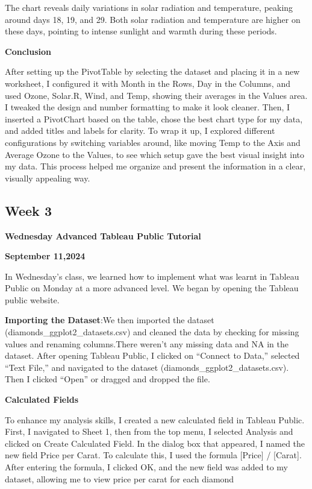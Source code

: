 \documentclass[
  letterpaper,
  DIV=11,
  numbers=noendperiod]{scrreprt}
\begin{document}
The chart reveals daily variations in solar radiation and temperature,
peaking around days 18, 19, and 29. Both solar radiation and temperature
are higher on these days, pointing to intense sunlight and warmth during
these periods.

\textbf{Conclusion}

After setting up the PivotTable by selecting the dataset and placing it
in a new worksheet, I configured it with Month in the Rows, Day in the
Columns, and used Ozone, Solar.R, Wind, and Temp, showing their averages
in the Values area. I tweaked the design and number formatting to make
it look cleaner. Then, I inserted a PivotChart based on the table, chose
the best chart type for my data, and added titles and labels for
clarity. To wrap it up, I explored different configurations by switching
variables around, like moving Temp to the Axis and Average Ozone to the
Values, to see which setup gave the best visual insight into my data.
This process helped me organize and present the information in a clear,
visually appealing way.

\subsection{Week 3}\label{week-3-5}

\textbf{Wednesday Advanced Tableau Public Tutorial}

\textbf{September 11,2024}

In Wednesday's class, we learned how to implement what was learnt in
Tableau Public on Monday at a more advanced level. We began by opening
the Tableau public website.

\textbf{Importing the Dataset}:We then imported the dataset
(diamonds\_ggplot2\_datasets.csv) and cleaned the data by checking for
missing values and renaming columns.There weren't any missing data and
NA in the dataset. After opening Tableau Public, I clicked on ``Connect
to Data,'' selected ``Text File,'' and navigated to the dataset
(diamonds\_ggplot2\_datasets.csv). Then I clicked ``Open'' or dragged
and dropped the file.

\textbf{Calculated Fields}

To enhance my analysis skills, I created a new calculated field in
Tableau Public. First, I navigated to Sheet 1, then from the top menu, I
selected Analysis and clicked on Create Calculated Field. In the dialog
box that appeared, I named the new field Price per Carat. To calculate
this, I used the formula {[}Price{]} / {[}Carat{]}. After entering the
formula, I clicked OK, and the new field was added to my dataset,
allowing me to view price per carat for each diamond
\end{document}
